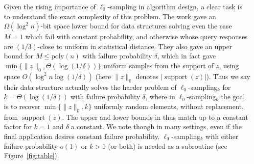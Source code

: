 \documentclass[11pt]{article}
\newcommand{\supp}{\mathop{support}}
\newcommand{\poly}{{\mathrm{poly}}}
\begin{document}
Given the rising importance of $\ell_0$-sampling in algorithm design, a clear task is to understand the exact complexity of this problem. The work \cite{JowhariST11} gave an $\Omega(\log^2 n)$-bit space lower bound for data structures solving even the case $M=1$ which fail with constant probability, and otherwise whose query responses are $(1/3)$-close to uniform in statistical distance. They also gave an upper bound for $M \le \poly(n)$ with failure probability $\delta$, which in fact gave $\min\{\|z\|_0, \Theta(\log(1/\delta))\}$ uniform samples from the support of $z$, using space $O(\log^2 n \log(1/\delta))$ (here $\|z\|_0$ denotes $|\supp(z)|$). Thus we say their data structure actually solves the harder problem of $\ell_0$-sampling$_k$ for $k =\Theta(\log(1/\delta))$ with failure probability $\delta$, where in $\ell_0$-sampling$_k$ the goal is to recover $\min\{\|z\|_0, k\}$ uniformly random elements, without replacement, from $\supp(z)$.  The upper and lower bounds in \cite{JowhariST11} thus match up to a constant factor for $k = 1$ and $\delta$ a constant. We note though in many settings, even if the final application desires constant failure probability, $\ell_0$-sampling$_k$ with either failure probability $o(1)$ or $k>1$ (or both) is needed as a subroutine (see Figure~\ref{fig:table}).
\end{document}
